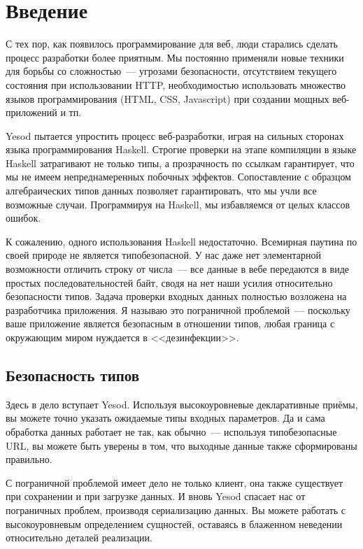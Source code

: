 \chapter{Введение}\label{chap:introduction}

С тех пор, как появилось программирование для веб, люди старались сделать процесс разработки более приятным. Мы постоянно применяли новые техники для борьбы со сложностью~--- угрозами безопасности, отсутствием текущего состояния при использовании HTTP, необходимостью использовать множество языков программирования (HTML, CSS, Javascript) при создании мощных веб-приложений и тп.

Yesod пытается упростить процесс веб-разработки, играя на сильных сторонах языка программирования Haskell. Строгие проверки на этапе компиляции в языке Haskell затрагивают не только типы, а прозрачность по ссылкам гарантирует, что мы не имеем непреднамеренных побочных эффектов. Сопоставление с образцом алгебраических типов данных позволяет гарантировать, что мы учли все возможные случаи. Программируя на Haskell, мы избавляемся от целых классов ошибок.

К сожалению, одного использования Haskell недостаточно. Всемирная паутина по своей природе не является типобезопасной. У нас даже нет элементарной возможности отличить строку от числа~--- все данные в вебе передаются в виде простых последовательностей байт, сводя на нет наши усилия относительно безопасности типов. Задача проверки входных данных полностью возложена на разработчика приложения. Я называю это пограничной проблемой~--- поскольку ваше приложение является безопасным в отношении типов, любая граница с окружающим миром нуждается в <<дезинфекции>>.

\section{Безопасность типов}

Здесь в дело вступает Yesod. Используя высокоуровневые декларативные приёмы, вы можете точно указать ожидаемые типы входных параметров. Да и сама обработка данных работает не так, как обычно~--- используя типобезопасные URL, вы можете быть уверены в том, что выходные данные также сформированы правильно.

С пограничной проблемой имеет дело не только клиент, она также существует при сохранении и при загрузке данных. И вновь Yesod спасает нас от пограничных проблем, производя сериализацию данных. Вы можете работать с высокоуровневым определением сущностей, оставаясь в блаженном неведении относительно деталей реализации.

